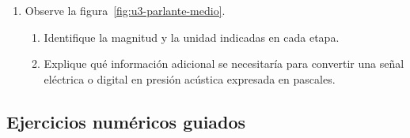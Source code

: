 \begin{enumerate}[label=\textbf{R\arabic*.},leftmargin=*]
    \item Observe la figura~\ref{fig:u3-parlante-medio}.
    \begin{enumerate}[label=\alph*)]
        \item Identifique la magnitud y la unidad indicadas en cada etapa.
        \item Explique qué información adicional se necesitaría para convertir
        una señal eléctrica o digital en presión acústica expresada en
        pascales.
    \end{enumerate}
\end{enumerate}

\subsection*{Ejercicios numéricos guiados}

